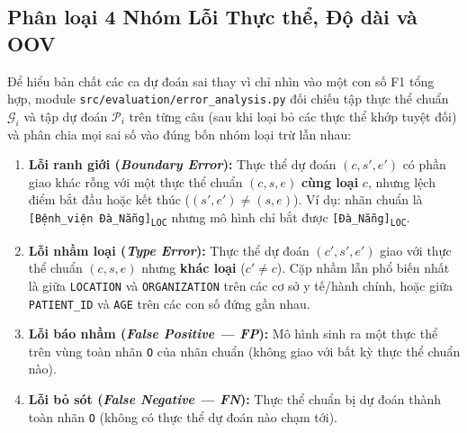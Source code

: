\documentclass[11pt,a4paper,twocolumn]{article}
\begin{document}
\subsection{Phân loại 4 Nhóm Lỗi Thực thể, Độ dài và OOV}
\label{sec:error_taxonomy}
Để hiểu bản chất các ca dự đoán sai thay vì chỉ nhìn vào một con số F1 tổng hợp, module \texttt{src/evaluation/error\_analysis.py} đối chiếu tập thực thể chuẩn $\mathcal{G}_i$ và tập dự đoán $\mathcal{P}_i$ trên từng câu (sau khi loại bỏ các thực thể khớp tuyệt đối) và phân chia mọi sai số vào đúng bốn nhóm loại trừ lẫn nhau:
\begin{enumerate}
  \item \textbf{Lỗi ranh giới (\textit{Boundary Error}):} Thực thể dự đoán $(c, s', e')$ có phần giao khác rỗng với một thực thể chuẩn $(c, s, e)$ \textbf{cùng loại} $c$, nhưng lệch điểm bắt đầu hoặc kết thúc ($(s', e') \ne (s, e)$). Ví dụ: nhãn chuẩn là \texttt{[Bệnh\_viện Đà\_Nẵng]\textsubscript{LOC}} nhưng mô hình chỉ bắt được \texttt{[Đà\_Nẵng]\textsubscript{LOC}}.
  \item \textbf{Lỗi nhầm loại (\textit{Type Error}):} Thực thể dự đoán $(c', s', e')$ giao với thực thể chuẩn $(c, s, e)$ nhưng \textbf{khác loại} ($c' \ne c$). Cặp nhầm lẫn phổ biến nhất là giữa \texttt{LOCATION} và \texttt{ORGANIZATION} trên các cơ sở y tế/hành chính, hoặc giữa \texttt{PATIENT\_ID} và \texttt{AGE} trên các con số đứng gần nhau.
  \item \textbf{Lỗi báo nhầm (\textit{False Positive — FP}):} Mô hình sinh ra một thực thể trên vùng toàn nhãn \texttt{O} của nhãn chuẩn (không giao với bất kỳ thực thể chuẩn nào).
  \item \textbf{Lỗi bỏ sót (\textit{False Negative — FN}):} Thực thể chuẩn bị dự đoán thành toàn nhãn \texttt{O} (không có thực thể dự đoán nào chạm tới).
\end{enumerate}
\end{document}
